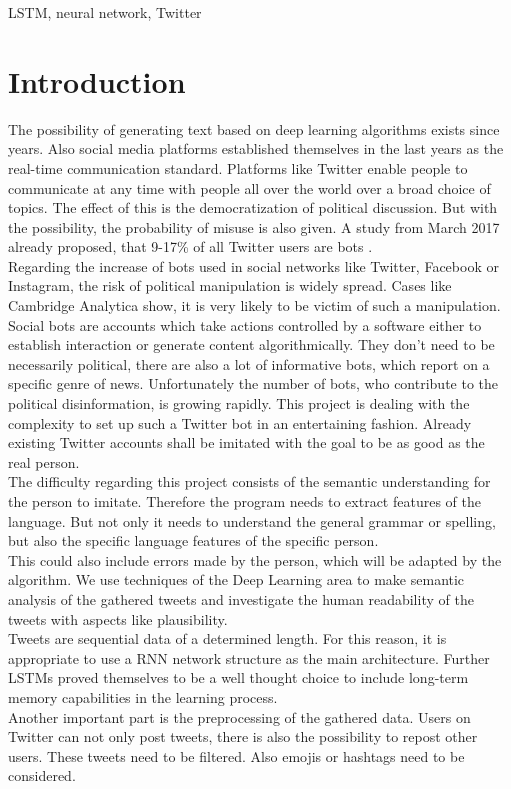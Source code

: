 \documentclass[conference]{IEEEtran}
\begin{document}
\begin{IEEEkeywords}
LSTM, neural network, Twitter
\end{IEEEkeywords}

\section{Introduction}

The possibility of generating text based on deep learning algorithms exists since years. Also social media platforms established themselves in the last years as the real-time communication standard. Platforms like Twitter enable people to communicate at any time with people all over the world over a broad choice of topics. The effect of this is the democratization of political discussion. But with the possibility, the probability of misuse is also given. A study from March 2017 already proposed, that 9-17\% of all Twitter users are bots \cite{tim1}.\\
Regarding the increase of bots used in social networks like Twitter, Facebook or Instagram, the risk of political manipulation is widely spread. Cases like Cambridge Analytica show, it is very likely to be victim of such a manipulation.\\
Social bots are accounts which take actions controlled by a software either to establish interaction or generate content algorithmically. They don’t need to be necessarily political, there are also a lot of informative bots, which report on a specific genre of news. Unfortunately the number of bots, who contribute to the political disinformation, is growing rapidly. This project is dealing with the complexity to set up such a Twitter bot in an entertaining fashion. Already existing Twitter accounts shall be imitated with the goal to be as good as the real person.\\
The difficulty regarding this project consists of the semantic understanding for the person to imitate. Therefore the program needs to extract features of the language. But not only it needs to understand the general grammar or spelling, but also the specific language features of the specific person.\\
This could also include errors made by the person, which will be adapted by the algorithm. We use techniques of the Deep Learning area to make semantic analysis of the gathered tweets and investigate the human readability of the tweets with aspects like plausibility.\\
Tweets are sequential data of a determined length. For this reason, it is appropriate to use a RNN network structure as the main architecture. Further LSTMs proved themselves to be a well thought choice to include long-term memory capabilities in the learning process.\\
Another important part is the preprocessing of the gathered data. Users on Twitter can not only post tweets, there is also the possibility to repost other users. These tweets need to be filtered. Also emojis or hashtags need to be considered.\\
\end{document}
